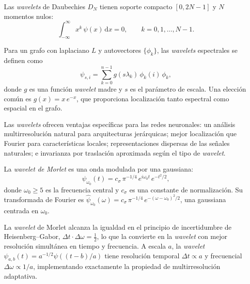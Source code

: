\begin{example}
\label{ex:grids:daubechies}
Las \emph{wavelets} de Daubechies $D_N$ tienen soporte compacto $[0, 2N-1]$ y
$N$ momentos nulos:
\[
  \int_{-\infty}^{\infty} x^k\, \psi(x)\, \mathrm{d}x = 0, \qquad k = 0, 1, \ldots, N-1.
\]
\end{example}

\begin{definition}
\label{def:grids:graph-wavelets}
Para un grafo con laplaciano $L$ y autovectores $\{\phi_k\}$, las \emph{wavelets}
espectrales se definen como
\[
  \psi_{s,i} = \sum_{k=0}^{n-1} g(s\lambda_k)\, \phi_k(i)\, \phi_k,
\]
donde $g$ es una funci\'on \emph{wavelet} madre y $s$ es el par\'ametro de
escala. Una elecci\'on com\'un es $g(x) = x\, e^{-x}$, que proporciona
localizaci\'on tanto espectral como espacial en el grafo.
\end{definition}

Las \emph{wavelets} ofrecen ventajas espec\'ificas para las redes neuronales: un
an\'alisis multirresoluci\'on natural para arquitecturas jer\'arquicas; mejor
localizaci\'on que Fourier para caracter\'isticas locales; representaciones
dispersas de las se\~nales naturales; e invarianza por traslaci\'on aproximada
seg\'un el tipo de \emph{wavelet}.

\begin{definition}
\label{def:grids:morlet}
La \emph{wavelet de Morlet} es una onda modulada por una gaussiana:
\[
  \psi_{\omega_0}(t) = c_\sigma\, \pi^{-1/4}\, e^{i\omega_0 t}\, e^{-t^2/2},
\]
donde $\omega_0 \geq 5$ es la frecuencia central y $c_\sigma$ es una constante de
normalizaci\'on. Su transformada de Fourier es
$\hat{\psi}_{\omega_0}(\omega) = c_\sigma\, \pi^{-1/4}\, e^{-(\omega - \omega_0)^2/2}$,
una gaussiana centrada en $\omega_0$.
\end{definition}

\begin{remark}
\label{rem:grids:morlet-resolution}
La \emph{wavelet} de Morlet alcanza la igualdad en el principio de incertidumbre
de Heisenberg--Gabor, $\Delta t \cdot \Delta \omega = \frac{1}{2}$, lo que la
convierte en la \emph{wavelet} con mejor resoluci\'on simult\'anea en tiempo y
frecuencia. A escala $a$, la \emph{wavelet}
$\psi_{a,b}(t) = a^{-1/2}\psi((t-b)/a)$ tiene resoluci\'on temporal
$\Delta t \propto a$ y frecuencial $\Delta \omega \propto 1/a$, implementando
exactamente la propiedad de multirresoluci\'on adaptativa.
\end{remark}

